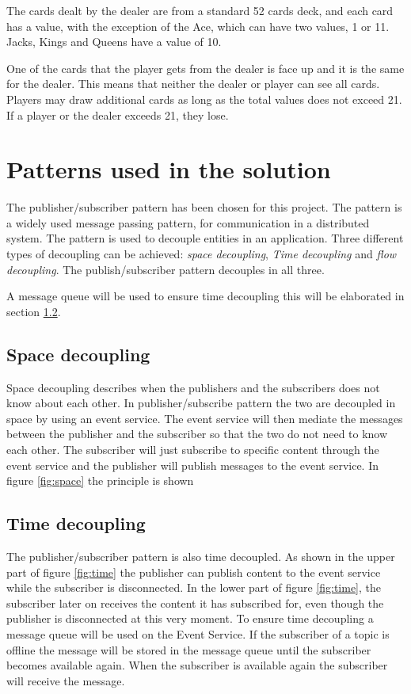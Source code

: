 The cards dealt by the dealer are from a standard 52 cards deck, and each card has a value, with the exception of the Ace, which can have two values, 1 or 11. Jacks, Kings and Queens have a value of 10.  

One of the cards that the player gets from the dealer is face up and it is the same for the dealer. This means that neither the dealer or player can see all cards. Players may draw additional cards as long as the total values does not exceed 21. If a player or the dealer exceeds 21, they lose. 

\section{Patterns used in the solution}
\label{chp:patterns}
The publisher/subscriber pattern has been chosen for this project. The pattern is a widely used message passing pattern, for communication in a distributed system. The pattern is used to decouple entities in an application. Three different types of decoupling can be achieved: \emph{space decoupling}, \emph{Time decoupling} and \emph{flow decoupling}. The publish/subscriber pattern decouples in all three. 

A message queue will be used to ensure time decoupling this will be elaborated in section \ref{sec:time}.

\subsection{Space decoupling}
Space decoupling describes when the publishers and the subscribers does not know about each other. In publisher/subscribe pattern the two are decoupled in space by using an event service. The event service will then mediate the messages between the publisher and the subscriber so that the two do not need to know each other. The subscriber will just subscribe to specific content through the event service and the publisher will publish messages to the event service. In figure \ref{fig:space} the principle is shown


\subsection{Time decoupling}
\label{sec:time}
The publisher/subscriber pattern is also time decoupled. As shown in the upper part of figure \ref{fig:time} the publisher can publish content to the event service while the subscriber is disconnected. In the lower part of figure \ref{fig:time}, the subscriber later on receives the content it has subscribed for, even though the publisher is disconnected at this very moment. To ensure time decoupling a message queue will be used on the Event Service. If the subscriber of a topic is offline the message will be stored in the message queue until the subscriber becomes available again. When the subscriber is available again the subscriber will receive the message.

